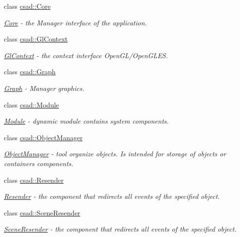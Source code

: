 \begin{DoxyCompactItemize}
class \hyperlink{classcsad_1_1_core}{csad\-::\-Core}
\begin{DoxyCompactList}\small\item\em \hyperlink{classcsad_1_1_core}{Core} -\/ the Manager interface of the application. \end{DoxyCompactList}\item 
class \hyperlink{classcsad_1_1_gl_context}{csad\-::\-Gl\-Context}
\begin{DoxyCompactList}\small\item\em \hyperlink{classcsad_1_1_gl_context}{Gl\-Context} -\/ the context interface Open\-G\-L/\-Open\-G\-L\-E\-S. \end{DoxyCompactList}\item 
class \hyperlink{classcsad_1_1_graph}{csad\-::\-Graph}
\begin{DoxyCompactList}\small\item\em \hyperlink{classcsad_1_1_graph}{Graph} -\/ Manager graphics. \end{DoxyCompactList}\item 
class \hyperlink{classcsad_1_1_module}{csad\-::\-Module}
\begin{DoxyCompactList}\small\item\em \hyperlink{classcsad_1_1_module}{Module} -\/ dynamic module contains system components. \end{DoxyCompactList}\item 
class \hyperlink{classcsad_1_1_object_manager}{csad\-::\-Object\-Manager}
\begin{DoxyCompactList}\small\item\em \hyperlink{classcsad_1_1_object_manager}{Object\-Manager} -\/ tool organize objects. Is intended for storage of objects or containers components. \end{DoxyCompactList}\item 
class \hyperlink{classcsad_1_1_resender}{csad\-::\-Resender}
\begin{DoxyCompactList}\small\item\em \hyperlink{classcsad_1_1_resender}{Resender} -\/ the component that redirects all events of the specified object. \end{DoxyCompactList}\item 
class \hyperlink{classcsad_1_1_scene_resender}{csad\-::\-Scene\-Resender}
\begin{DoxyCompactList}\small\item\em \hyperlink{classcsad_1_1_scene_resender}{Scene\-Resender} -\/ the component that redirects all events of the specified object. \end{DoxyCompactList}\item 

\end{DoxyCompactItemize}

